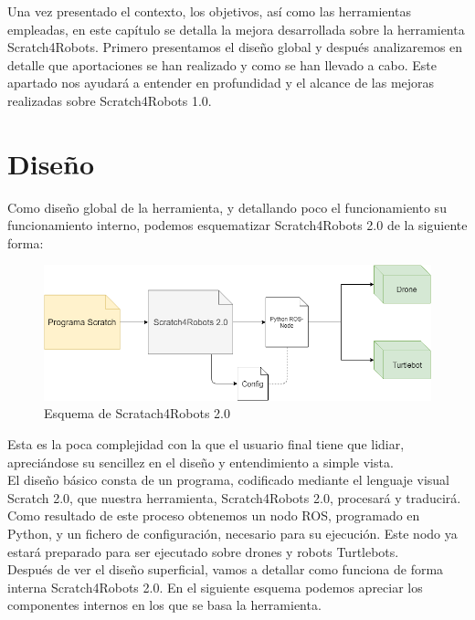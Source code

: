 Una vez presentado el contexto, los objetivos, así como las herramientas empleadas, en este capítulo se detalla la mejora desarrollada sobre la herramienta Scratch4Robots. Primero presentamos el diseño global y después analizaremos en detalle que aportaciones se han realizado y como se han llevado a cabo. Este apartado nos ayudará a entender en profundidad y el alcance de las mejoras realizadas sobre Scratch4Robots 1.0.\\


\section{Diseño}
\label{sec:diseno}
Como diseño global de la herramienta, y detallando poco el funcionamiento su funcionamiento interno, podemos esquematizar Scratch4Robots 2.0 de la siguiente forma:\\

\begin{figure}[H]
    \centering
    \includegraphics[scale=0.55]{img/esq-caja-negra.png}
  	\caption{Esquema de Scratach4Robots 2.0}
  	\label{fig:s4r-detalle}
\end{figure}

Esta es la poca complejidad con la que el usuario final tiene que lidiar, apreciándose su sencillez en el diseño y entendimiento a simple vista.\\

El diseño básico consta de un programa, codificado mediante el lenguaje visual Scratch 2.0, que nuestra herramienta, Scratch4Robots 2.0, procesará y traducirá. Como resultado de este proceso obtenemos un nodo ROS, programado en Python, y un fichero de configuración, necesario para su ejecución. Este nodo ya estará preparado para ser ejecutado sobre drones y robots Turtlebots.\\

Después de ver el diseño superficial, vamos a detallar como funciona de forma interna Scratch4Robots 2.0. En el siguiente esquema podemos apreciar los componentes internos en los que se basa la herramienta.\\


